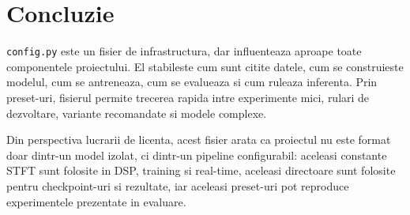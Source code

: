 \documentclass[12pt,a4paper]{report}
\begin{document}
\chapter{Concluzie}

\texttt{config.py} este un fisier de infrastructura, dar influenteaza aproape
toate componentele proiectului. El stabileste cum sunt citite datele, cum se
construieste modelul, cum se antreneaza, cum se evalueaza si cum ruleaza inferenta.
Prin preset-uri, fisierul permite trecerea rapida intre experimente mici, rulari
de dezvoltare, variante recomandate si modele complexe.

Din perspectiva lucrarii de licenta, acest fisier arata ca proiectul nu este
format doar dintr-un model izolat, ci dintr-un pipeline configurabil: aceleasi
constante STFT sunt folosite in DSP, training si real-time, aceleasi directoare
sunt folosite pentru checkpoint-uri si rezultate, iar aceleasi preset-uri pot
reproduce experimentele prezentate in evaluare.
\end{document}

